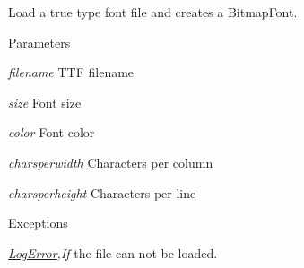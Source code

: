 Load a true type font file and creates a BitmapFont. 
\begin{DoxyParams}{Parameters}
\item[{\em filename}]TTF filename \item[{\em size}]Font size \item[{\em color}]Font color \item[{\em charsperwidth}]Characters per column \item[{\em charsperheight}]Characters per line \end{DoxyParams}

\begin{DoxyExceptions}{Exceptions}
\item[{\em \hyperlink{class_f2_c_1_1_log_error}{LogError},If}]the file can not be loaded. \end{DoxyExceptions}
